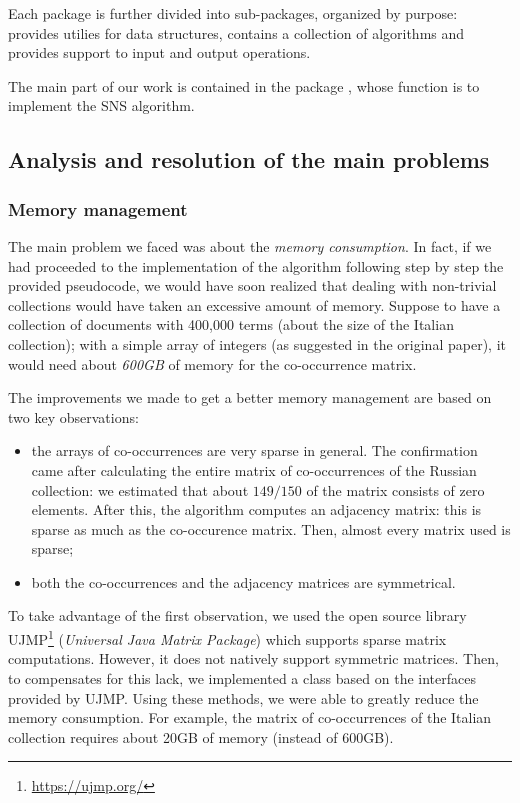 		Each package is further divided into sub-packages, organized by purpose:  provides utilies for data structures,  contains a collection of algorithms and  provides support to input and output operations.

        The main part of our work is contained in the package , whose function is to implement the SNS algorithm.

    \subsection{Analysis and resolution of the main problems}
        \subsubsection{Memory management}\label{sec:memory-management}
            The main problem we faced was about the \emph{memory consumption}. In fact, if we had proceeded to the implementation of the algorithm following step by step the provided pseudocode, we would have soon realized that dealing with non-trivial collections would have taken an excessive amount of memory. Suppose to have a collection of documents with 400,000 terms (about the size of the Italian collection); with a simple array of integers (as suggested in the original paper), it would need about \emph{600GB} of memory for the co-occurrence matrix.

            The improvements we made to get a better memory management are based on two key observations:
            \begin{itemize}
                \item the arrays of co-occurrences are very sparse in general. The confirmation came after calculating the entire matrix of co-occurrences of the Russian collection: we estimated that about \(149/150\) of the matrix consists of zero elements. After this, the algorithm computes an adjacency matrix: this is sparse as much as the co-occurence matrix. Then, almost every matrix used is sparse;
                \item both the co-occurrences and the adjacency matrices are symmetrical.
            \end{itemize}
            

            To take advantage of the first observation, we used the open source library UJMP\footnote{\url{https://ujmp.org/}} (\emph{Universal Java Matrix Package}) which supports sparse matrix computations. However, it does not natively support symmetric matrices. Then, to compensates for this lack, we implemented a class based on the interfaces provided by UJMP. Using these methods, we were able to greatly reduce the memory consumption. For example, the matrix of co-occurrences of the Italian collection requires about 20GB of memory (instead of 600GB).


